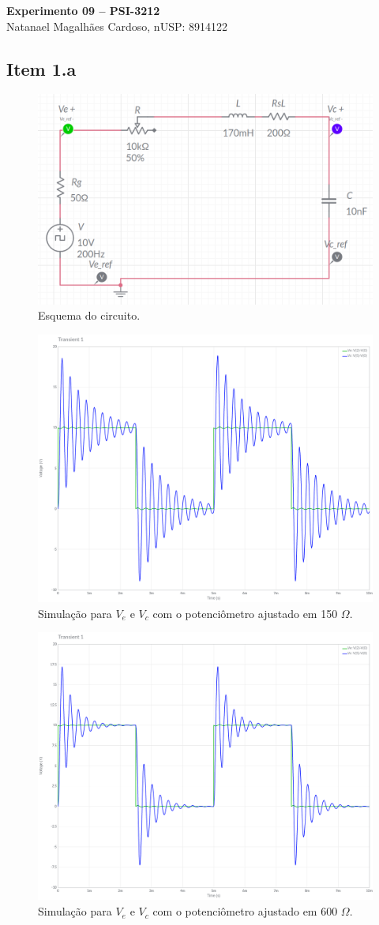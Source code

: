 \documentclass[11pt]{article}
\begin{document}
\begin{center}
  \textbf{Experimento 09 -- PSI-3212} \\
  Natanael Magalhães Cardoso, nUSP: 8914122
\end{center}

\subsection*{Item 1.a}

\begin{figure}[h!]
  \centering
  \includegraphics[width=.6\textwidth]{fig/1-circ}
  \caption{Esquema do circuito.}
  \label{fig:1-circ}
\end{figure}

\begin{figure}[h!]
  \centering
  \includegraphics[width=.6\textwidth]{fig/1a-1}
  \caption{Simulação para $V_{e}$ e $V_{c}$ com o potenciômetro ajustado em 150 $\Omega$.}
  \label{fig:1a-1}
\end{figure}

\begin{figure}[h!]
  \centering
  \includegraphics[width=.6\textwidth]{fig/1a-2}
  \caption{Simulação para $V_{e}$ e $V_{c}$ com o potenciômetro ajustado em 600 $\Omega$.}
  \label{fig:1a-2}
\end{figure}
\end{document}
